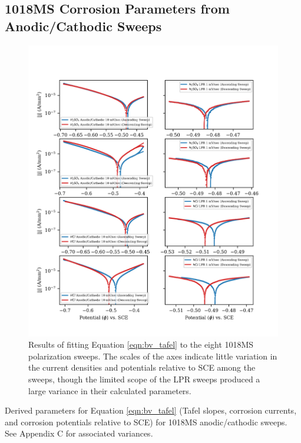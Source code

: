 \subsection{1018MS Corrosion Parameters from Anodic/Cathodic Sweeps}

	\begin{figure}[h!]
		\centering
		\includegraphics[width=5.0in]{resources/fig_2b.png}
		\caption{Results of fitting Equation \ref{eqn:bv_tafel} to the eight 1018MS polarization sweeps.  The scales of the axes indicate little variation in the current densities and potentials relative to SCE among the sweeps, though the limited scope of the LPR sweeps produced a large variance in their calculated parameters.}
		\label{fig:anocat}
	\end{figure}

	\begin{table}[h!]
		\centering
		
		\caption{Derived parameters for Equation \ref{eqn:bv_tafel} (Tafel slopes, corrosion currents, and corrosion potentials relative to SCE) for 1018MS anodic/cathodic sweeps.  See Appendix C for associated variances.}
		\label{table:anocat}
	\end{table}

